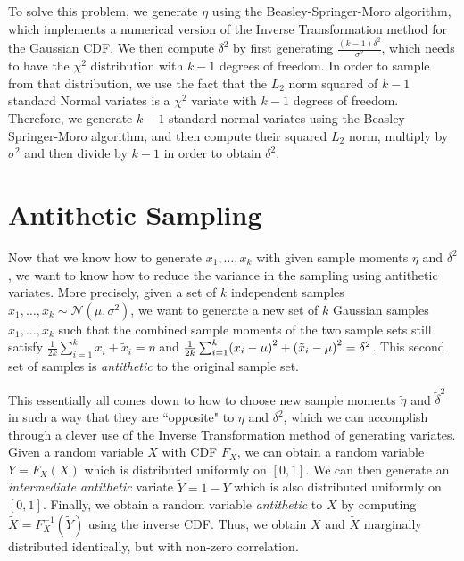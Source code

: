 \documentclass[12pt, a4paper]{article}
\DeclarePairedDelimiter \parens{(}{)}
\begin{document}
        To solve this problem, we generate $\eta$ using the Beasley-Springer-Moro algorithm,
        which implements a numerical version of the Inverse Transformation method for the Gaussian CDF.
        We then compute $\delta^2$ by first generating $\frac{(k - 1)\delta^2}{\sigma^2}$, which needs to have the $\chi^2$ distribution with $k - 1$ degrees of freedom.
        In order to sample from that distribution,
        we use the fact that the $L_2$ norm squared of $k - 1$ standard Normal variates is a $\chi^2$ variate with $k - 1$ degrees of freedom.
        Therefore, we generate $k - 1$ standard normal variates using the Beasley-Springer-Moro algorithm, and then compute their squared $L_2$ norm,
        multiply by $\sigma^2$ and then divide by $k - 1$ in order to obtain $\delta^2$.

\section{Antithetic Sampling} \label{sec:3}
Now that we know how to generate $x_1, \dots, x_k$ with given sample moments $\eta$ and $\delta^2$,
we want to know how to reduce the variance in the sampling using antithetic variates.
More precisely, given a set of $k$ independent samples $x_1, \dots, x_k \sim \mathcal{N}(\mu, \sigma^2)$,
we want to generate a new set of $k$ Gaussian samples $\tilde{x}_1, \dots, \tilde{x}_k$
such that the combined sample moments of the two sample sets still satisfy
$\frac{1}{2k}\sum_{i = 1}^{k}x_i + \tilde{x}_i = \eta$ and $\frac{1}{2k}\sum_{i = 1}^{k}\parens*{x_i - \mu}^2 + \parens*{\tilde{x}_i - \mu}^2 = \delta^2$.
This second set of samples is {\it antithetic} to the original sample set.

This essentially all comes down to how to choose new sample moments $\tilde{\eta}$ and $\tilde{\delta}^2$ in such a way that they are ``opposite" to $\eta$ and $\delta^2$,
which we can accomplish through a clever use of the Inverse Transformation method of generating variates.
Given a random variable $X$ with CDF $F_X$, we can obtain a random variable $Y = F_X(X)$ which is distributed uniformly on $[0, 1]$.
We can then generate an {\it intermediate antithetic} variate $\tilde{Y} = 1 - Y$ which is also distributed uniformly on $[0, 1]$.
Finally, we obtain a random variable {\it antithetic} to $X$ by computing $\tilde{X} = F_X^{-1}(\tilde{Y})$ using the inverse CDF.
Thus, we obtain $X$ and $\tilde{X}$ marginally distributed identically, but with non-zero correlation.
\end{document}

